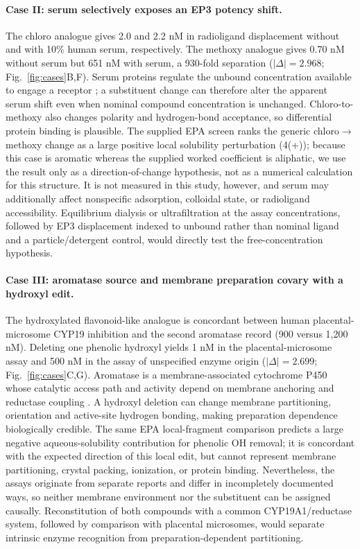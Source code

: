 \documentclass[letterpaper]{article}
\begin{document}
\paragraph{Case II: serum selectively exposes an EP3 potency shift.}
The chloro analogue gives 2.0 and 2.2 nM in radioligand displacement without and with 10\% human serum, respectively. The methoxy analogue gives 0.70 nM without serum but 651 nM with serum, a 930-fold separation ($|\Delta|=2.968$; Fig.~\ref{fig:cases}B,F). Serum proteins regulate the unbound concentration available to engage a receptor \citep{trainor2007proteinbinding}; a substituent change can therefore alter the apparent serum shift even when nominal compound concentration is unchanged. Chloro-to-methoxy also changes polarity and hydrogen-bond acceptance, so differential protein binding is plausible. The supplied EPA screen ranks the generic chloro$\rightarrow$methoxy change as a large positive local solubility perturbation (4(+)); because this case is aromatic whereas the supplied worked coefficient is aliphatic, we use the result only as a direction-of-change hypothesis, not as a numerical calculation for this structure. It is not measured in this study, however, and serum may additionally affect nonspecific adsorption, colloidal state, or radioligand accessibility. Equilibrium dialysis or ultrafiltration at the assay concentrations, followed by EP3 displacement indexed to unbound rather than nominal ligand and a particle/detergent control, would directly test the free-concentration hypothesis.

\paragraph{Case III: aromatase source and membrane preparation covary with a hydroxyl edit.}
The hydroxylated flavonoid-like analogue is concordant between human placental-microsome CYP19 inhibition and the second aromatase record (900 versus 1,200 nM). Deleting one phenolic hydroxyl yields 1 nM in the placental-microsome assay and 500 nM in the assay of unspecified enzyme origin ($|\Delta|=2.699$; Fig.~\ref{fig:cases}C,G). Aromatase is a membrane-associated cytochrome P450 whose catalytic access path and activity depend on membrane anchoring and reductase coupling \citep{ghosh2009aromatase}. A hydroxyl deletion can change membrane partitioning, orientation and active-site hydrogen bonding, making preparation dependence biologically credible. The same EPA local-fragment comparison predicts a large negative aqueous-solubility contribution for phenolic OH removal; it is concordant with the expected direction of this local edit, but cannot represent membrane partitioning, crystal packing, ionization, or protein binding. Nevertheless, the assays originate from separate reports and differ in incompletely documented ways, so neither membrane environment nor the substituent can be assigned causally. Reconstitution of both compounds with a common CYP19A1/reductase system, followed by comparison with placental microsomes, would separate intrinsic enzyme recognition from preparation-dependent partitioning.
\end{document}
